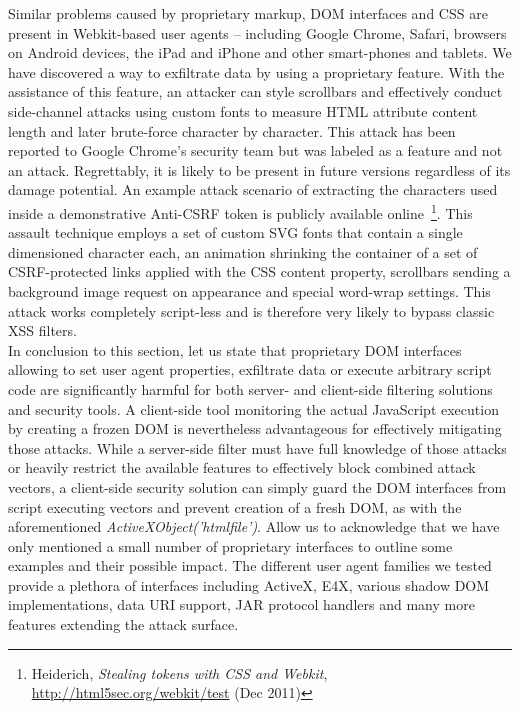     Similar problems caused by proprietary markup, DOM interfaces and CSS are present in Webkit-based user agents -- including Google Chrome, Safari, browsers on Android devices, the iPad and iPhone and other smart-phones and tablets. We have discovered a way to exfiltrate data by using a proprietary feature. With the assistance of this feature, an attacker can style scrollbars and effectively conduct side-channel attacks using custom fonts to measure HTML attribute content length and later brute-force character by character. This attack has been reported to Google Chrome's security team but was labeled as a feature and not an attack. Regrettably, it is likely to be present in future versions regardless of its damage potential. An example attack scenario of extracting the characters used inside a demonstrative Anti-CSRF token is publicly available online~\footnote{Heiderich, \textit{Stealing tokens with CSS and Webkit}, \url{http://html5sec.org/webkit/test} (Dec 2011)}. This assault technique employs a set of custom SVG fonts that contain a single dimensioned character each, an animation shrinking the container of a set of CSRF-protected links applied with the CSS content property, scrollbars sending a background image request on appearance and special word-wrap settings. This attack works completely script-less and is therefore very likely to bypass classic XSS filters.\\

    In conclusion to this section, let us state that proprietary DOM interfaces allowing to set user agent properties, exfiltrate data or execute arbitrary script code are significantly harmful for both server- and client-side filtering solutions and security tools. A client-side tool monitoring the actual JavaScript execution by creating a frozen DOM is nevertheless advantageous for effectively mitigating those attacks. While a server-side filter must have full knowledge of those attacks or heavily restrict the available features to effectively block combined attack vectors, a client-side security solution can simply guard the DOM interfaces from script executing vectors and prevent creation of a fresh DOM, as with the aforementioned \textit{ActiveXObject('htmlfile')}. Allow us to acknowledge that we have only mentioned a small number of proprietary interfaces to outline some examples and their possible impact. The different user agent families we tested provide a plethora of interfaces including ActiveX, E4X, various shadow DOM implementations, data URI support, JAR protocol handlers and many more features extending the attack surface.

